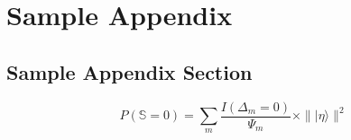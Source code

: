 \chapter{Sample Appendix}\label{app:1}
\section{Sample Appendix Section}\label{app:1:1}
\lipsum[1]

\begin{equation}
    \textit{P}(\mathbb{S} = 0) = 
    \sum_{m}\frac{I(\Delta_m=0)}{\Psi_m} \times \| |\eta \rangle \|^2
    \label{eq:sample}
\end{equation}